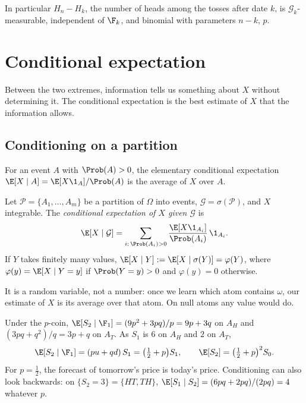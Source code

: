 In particular $H_n-H_k$, the number of heads among the tosses after date $k$, is
$\mathcal G_k$-measurable, independent of $\F_k$, and binomial with parameters $n-k$, $p$.

\section{Conditional expectation}\label{sec:pr-condexp}

Between the two extremes, information tells us something about $X$ without determining it.
The conditional expectation is the best estimate of $X$ that the information allows.

\subsection{Conditioning on a partition}

For an event $A$ with $\Prob(A)>0$, the elementary conditional expectation
$\E[X\mid A]=\E[X\1_A]/\Prob(A)$ is the average of $X$ over $A$.

\begin{definition}\label{def:pr-condexp-discrete}
Let $\mathcal P=\{A_1,\dots,A_m\}$ be a partition of $\Omega$ into events,
$\mathcal G=\sigma(\mathcal P)$, and $X$ integrable. The \emph{conditional expectation of $X$
given $\mathcal G$} is
\begin{equation}\label{eq:pr-condexp-discrete}
  \E[X\mid\mathcal G]=\sum_{i:\,\Prob(A_i)>0}\frac{\E[X\1_{A_i}]}{\Prob(A_i)}\,\1_{A_i}.
\end{equation}
If $Y$ takes finitely many values, $\E[X\mid Y]:=\E[X\mid\sigma(Y)]=\varphi(Y)$, where
$\varphi(y)=\E[X\mid Y=y]$ if $\Prob(Y=y)>0$ and $\varphi(y)=0$ otherwise.
\end{definition}

It is a random variable, not a number: once we learn which atom contains $\omega$, our
estimate of $X$ is its average over that atom. On null atoms any value would do.

\begin{example}\label{exa:pr-two-tosses-ce}
Under the $p$-coin, $\E[S_2\mid\F_1]=(9p^2+3pq)/p=9p+3q$ on $A_H$ and $(3pq+q^2)/q=3p+q$ on
$A_T$. As $S_1$ is $6$ on $A_H$ and $2$ on $A_T$,
\[
  \E[S_2\mid\F_1]=(pu+qd)\,S_1=\big(\tfrac12+p\big)S_1,\qquad \E[S_2]=\big(\tfrac12+p\big)^2S_0 .
\]
For $p=\frac12$, the forecast of tomorrow's price is today's price. Conditioning can also
look backwards: on $\{S_2=3\}=\{HT,TH\}$, $\E[S_1\mid S_2]=(6pq+2pq)/(2pq)=4$ whatever $p$.
\end{example}

